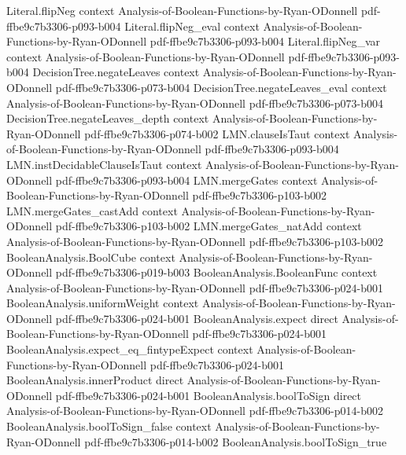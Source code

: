 \begin{theorem}
\proofstep
  {Literal.flipNeg}
  {context}
  {Analysis-of-Boolean-Functions-by-Ryan-ODonnell}
  {pdf-ffbe9c7b3306-p093-b004}
\proofstep
  {Literal.flipNeg_eval}
  {context}
  {Analysis-of-Boolean-Functions-by-Ryan-ODonnell}
  {pdf-ffbe9c7b3306-p093-b004}
\proofstep
  {Literal.flipNeg_var}
  {context}
  {Analysis-of-Boolean-Functions-by-Ryan-ODonnell}
  {pdf-ffbe9c7b3306-p093-b004}
\proofstep
  {DecisionTree.negateLeaves}
  {context}
  {Analysis-of-Boolean-Functions-by-Ryan-ODonnell}
  {pdf-ffbe9c7b3306-p073-b004}
\proofstep
  {DecisionTree.negateLeaves_eval}
  {context}
  {Analysis-of-Boolean-Functions-by-Ryan-ODonnell}
  {pdf-ffbe9c7b3306-p073-b004}
\proofstep
  {DecisionTree.negateLeaves_depth}
  {context}
  {Analysis-of-Boolean-Functions-by-Ryan-ODonnell}
  {pdf-ffbe9c7b3306-p074-b002}
\proofstep
  {LMN.clauseIsTaut}
  {context}
  {Analysis-of-Boolean-Functions-by-Ryan-ODonnell}
  {pdf-ffbe9c7b3306-p093-b004}
\proofstep
  {LMN.instDecidableClauseIsTaut}
  {context}
  {Analysis-of-Boolean-Functions-by-Ryan-ODonnell}
  {pdf-ffbe9c7b3306-p093-b004}
\proofstep
  {LMN.mergeGates}
  {context}
  {Analysis-of-Boolean-Functions-by-Ryan-ODonnell}
  {pdf-ffbe9c7b3306-p103-b002}
\proofstep
  {LMN.mergeGates_castAdd}
  {context}
  {Analysis-of-Boolean-Functions-by-Ryan-ODonnell}
  {pdf-ffbe9c7b3306-p103-b002}
\proofstep
  {LMN.mergeGates_natAdd}
  {context}
  {Analysis-of-Boolean-Functions-by-Ryan-ODonnell}
  {pdf-ffbe9c7b3306-p103-b002}
\proofstep
  {BooleanAnalysis.BoolCube}
  {context}
  {Analysis-of-Boolean-Functions-by-Ryan-ODonnell}
  {pdf-ffbe9c7b3306-p019-b003}
\proofstep
  {BooleanAnalysis.BooleanFunc}
  {context}
  {Analysis-of-Boolean-Functions-by-Ryan-ODonnell}
  {pdf-ffbe9c7b3306-p024-b001}
\proofstep
  {BooleanAnalysis.uniformWeight}
  {context}
  {Analysis-of-Boolean-Functions-by-Ryan-ODonnell}
  {pdf-ffbe9c7b3306-p024-b001}
\proofstep
  {BooleanAnalysis.expect}
  {direct}
  {Analysis-of-Boolean-Functions-by-Ryan-ODonnell}
  {pdf-ffbe9c7b3306-p024-b001}
\proofstep
  {BooleanAnalysis.expect_eq_fintypeExpect}
  {context}
  {Analysis-of-Boolean-Functions-by-Ryan-ODonnell}
  {pdf-ffbe9c7b3306-p024-b001}
\proofstep
  {BooleanAnalysis.innerProduct}
  {direct}
  {Analysis-of-Boolean-Functions-by-Ryan-ODonnell}
  {pdf-ffbe9c7b3306-p024-b001}
\proofstep
  {BooleanAnalysis.boolToSign}
  {direct}
  {Analysis-of-Boolean-Functions-by-Ryan-ODonnell}
  {pdf-ffbe9c7b3306-p014-b002}
\proofstep
  {BooleanAnalysis.boolToSign_false}
  {context}
  {Analysis-of-Boolean-Functions-by-Ryan-ODonnell}
  {pdf-ffbe9c7b3306-p014-b002}
\proofstep
  {BooleanAnalysis.boolToSign_true}

\end{theorem}
